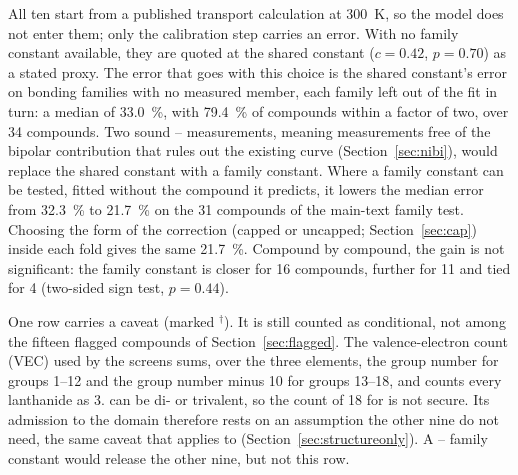 \documentclass[preprint, 12pt]{elsarticle}
\begin{document}
All ten start from a published transport calculation at \SI{300}{\kelvin}, so the model
does not enter them; only the calibration step carries an error. With no family constant available,
they are quoted at the shared constant ($c=\num{0.42}$, $p=\num{0.70}$) as a stated proxy. The error
that goes with this choice is the shared constant's error on bonding families with no measured
member, each family left out of the fit in turn: a median of \SI{33.0}{\percent}, with
\SI{79.4}{\percent} of compounds within a factor of two, over \num{34} compounds. Two sound
-- measurements, meaning measurements free of the bipolar contribution that rules out
the existing  curve (Section~\ref{sec:nibi}), would replace the shared constant with a
family constant. Where a family constant can be tested, fitted without the compound it predicts, it
lowers the median error from \SI{32.3}{\percent} to \SI{21.7}{\percent} on the \num{31} compounds of
the main-text family test. Choosing the form of the correction (capped or uncapped;
Section~\ref{sec:cap}) inside each fold gives the same \SI{21.7}{\percent}. Compound by compound,
the gain is not significant: the family constant is closer for \num{16} compounds, further for
\num{11} and tied for \num{4} (two-sided sign test, $p=\num{0.44}$).

One row carries a caveat (marked $^{\dagger}$). It is still counted as conditional, not among the
fifteen flagged compounds of Section~\ref{sec:flagged}. The valence-electron count (VEC) used by the
screens sums, over the three
elements, the group number for groups 1--12 and the group number minus 10 for groups 13--18, and
counts every lanthanide as 3.  can be di- or trivalent, so the count of 18 for 
is not secure. Its admission to the domain therefore rests on an assumption the other nine do not
need, the same caveat that applies to  (Section~\ref{sec:structureonly}). A
-- family constant would release the other nine, but not this row.
\end{document}
